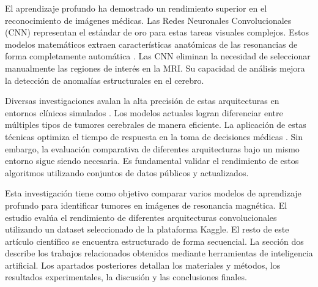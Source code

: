 El aprendizaje profundo ha demostrado un rendimiento superior en el reconocimiento de imágenes médicas. Las Redes Neuronales Convolucionales (CNN) representan el estándar de oro para estas tareas visuales complejos. Estos modelos matemáticos extraen características anatómicas de las resonancias de forma completamente automática \cite{Khan2022}. Las CNN eliminan la necesidad de seleccionar manualmente las regiones de interés en la MRI. Su capacidad de análisis mejora la detección de anomalías estructurales en el cerebro.

Diversas investigaciones avalan la alta precisión de estas arquitecturas en entornos clínicos simulados \cite{Mahmud2023}. Los modelos actuales logran diferenciar entre múltiples tipos de tumores cerebrales de manera eficiente. La aplicación de estas técnicas optimiza el tiempo de respuesta en la toma de decisiones médicas \cite{Dorfner2025}. Sin embargo, la evaluación comparativa de diferentes arquitecturas bajo un mismo entorno sigue siendo necesaria. Es fundamental validar el rendimiento de estos algoritmos utilizando conjuntos de datos públicos y actualizados.

Esta investigación tiene como objetivo comparar varios modelos de aprendizaje profundo para identificar tumores en imágenes de resonancia magnética. El estudio evalúa el rendimiento de diferentes arquitecturas convolucionales utilizando un dataset seleccionado de la plataforma Kaggle. El resto de este artículo científico se encuentra estructurado de forma secuencial. La sección dos describe los trabajos relacionados obtenidos mediante herramientas de inteligencia artificial. Los apartados posteriores detallan los materiales y métodos, los resultados experimentales, la discusión y las conclusiones finales.
